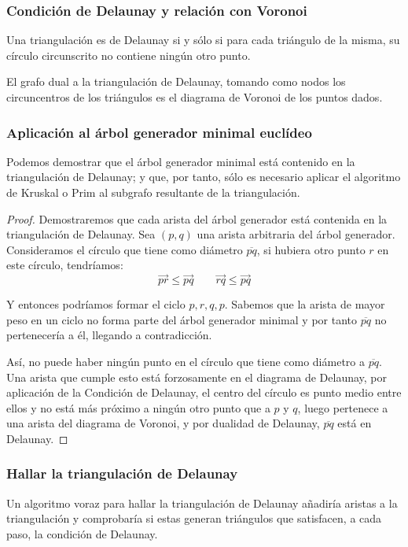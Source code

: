 \documentclass[a4paper, 11pt]{article} %
\begin{document}
    \subsubsection{Condición de Delaunay y relación con Voronoi}
      Una triangulación es de Delaunay si y sólo si para cada triángulo de la misma, su círculo circunscrito no
      contiene ningún otro punto.
      
      El grafo dual a la triangulación de Delaunay, tomando como nodos los circuncentros de los triángulos es el
      diagrama de Voronoi de los puntos dados.
    
    \subsubsection{Aplicación al árbol generador minimal euclídeo}
    Podemos demostrar que el árbol generador minimal está contenido en la triangulación de Delaunay;
    y que, por tanto, sólo es necesario aplicar el algoritmo de Kruskal o Prim al subgrafo resultante de la triangulación.
    
    \begin{proof}
      Demostraremos que cada arista del árbol generador está contenida en la triangulación de Delaunay.
      Sea $(p,q)$ una arista arbitraria del árbol generador. 
      Consideramos el círculo que tiene como diámetro $\overline{pq}$, si hubiera otro punto $r$ en este círculo, tendríamos:
      \begin{equation}
       \overrightarrow{pr} \leq \overrightarrow{pq} \qquad \overrightarrow{rq} \leq \overrightarrow{pq}
      \end{equation}

      Y entonces podríamos formar el ciclo $p,r,q,p$. Sabemos que la arista de mayor peso en un ciclo no forma parte del árbol generador minimal y por tanto $\overline{pq}$
      no pertenecería a él, llegando a contradicción.

      Así, no puede haber ningún punto en el círculo que tiene como diámetro a $\overline{pq}$. Una arista que cumple esto está forzosamente en el diagrama de Delaunay,
      por aplicación de la Condición de Delaunay, el centro del círculo es punto medio entre ellos y no está más próximo a ningún otro punto que a $p$ y $q$, luego pertenece
      a una arista del diagrama de Voronoi, y por dualidad de Delaunay, $\overline{pq}$ está en Delaunay.
    \end{proof}
    
    \subsubsection{Hallar la triangulación de Delaunay}
      Un algoritmo voraz para hallar la triangulación de Delaunay añadiría aristas a la triangulación y comprobaría si estas
      generan triángulos que satisfacen, a cada paso, la condición de Delaunay.
    
\end{document}
